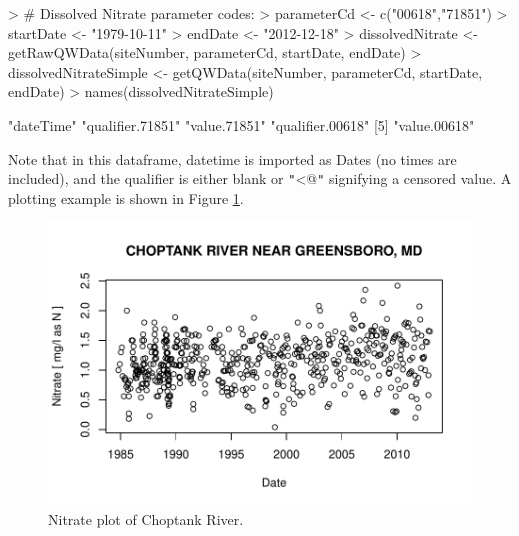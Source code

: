\documentclass[a4paper,11pt]{article}
\begin{document}
\begin{Schunk}
\begin{Sinput}
> # Dissolved Nitrate parameter codes:
> parameterCd <- c("00618","71851")
> startDate <- "1979-10-11"
> endDate <- "2012-12-18"
> dissolvedNitrate <- getRawQWData(siteNumber, parameterCd, 
       startDate, endDate)
> dissolvedNitrateSimple <- getQWData(siteNumber, parameterCd, 
         startDate, endDate)
> names(dissolvedNitrateSimple)
\end{Sinput}
\begin{Soutput}
[1] "dateTime"        "qualifier.71851" "value.71851"     "qualifier.00618"
[5] "value.00618"    
\end{Soutput}
\end{Schunk}
Note that in this dataframe, datetime is imported as Dates (no times are included), and the qualifier is either blank or \texttt{"}\verb@<@\texttt{"} signifying a censored value. A plotting example is shown in Figure \ref{fig:nitrate}.

\begin{Schunk}
\end{Schunk}

\begin{figure}
\begin{center}
\includegraphics{dataRetrieval-fig3}
\end{center}
\caption{Nitrate plot of Choptank River.}
\label{fig:nitrate}
\end{figure}
\end{document}
